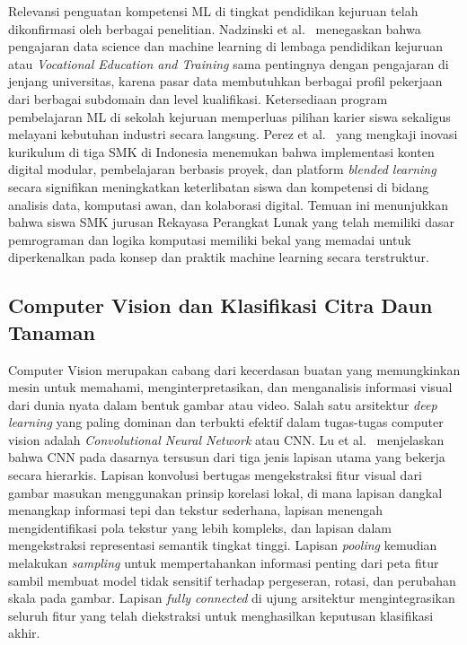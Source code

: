 Relevansi penguatan kompetensi ML di tingkat pendidikan kejuruan telah dikonfirmasi oleh berbagai penelitian. Nadzinski et al.\ \cite{Nadzinski2023} menegaskan bahwa pengajaran data science dan machine learning di lembaga pendidikan kejuruan atau \textit{Vocational Education and Training} sama pentingnya dengan pengajaran di jenjang universitas, karena pasar data membutuhkan berbagai profil pekerjaan dari berbagai subdomain dan level kualifikasi. Ketersediaan program pembelajaran ML di sekolah kejuruan memperluas pilihan karier siswa sekaligus melayani kebutuhan industri secara langsung. Perez et al.\ \cite{Kurikulum2025} yang mengkaji inovasi kurikulum di tiga SMK di Indonesia menemukan bahwa implementasi konten digital modular, pembelajaran berbasis proyek, dan platform \textit{blended learning} secara signifikan meningkatkan keterlibatan siswa dan kompetensi di bidang analisis data, komputasi awan, dan kolaborasi digital. Temuan ini menunjukkan bahwa siswa SMK jurusan Rekayasa Perangkat Lunak yang telah memiliki dasar pemrograman dan logika komputasi memiliki bekal yang memadai untuk diperkenalkan pada konsep dan praktik machine learning secara terstruktur.

\subsection{Computer Vision dan Klasifikasi Citra Daun Tanaman}
Computer Vision merupakan cabang dari kecerdasan buatan yang memungkinkan mesin untuk memahami, menginterpretasikan, dan menganalisis informasi visual dari dunia nyata dalam bentuk gambar atau video. Salah satu arsitektur \textit{deep learning} yang paling dominan dan terbukti efektif dalam tugas-tugas computer vision adalah \textit{Convolutional Neural Network} atau CNN. Lu et al.\ \cite{Lu2021} menjelaskan bahwa CNN pada dasarnya tersusun dari tiga jenis lapisan utama yang bekerja secara hierarkis. Lapisan konvolusi bertugas mengekstraksi fitur visual dari gambar masukan menggunakan prinsip korelasi lokal, di mana lapisan dangkal menangkap informasi tepi dan tekstur sederhana, lapisan menengah mengidentifikasi pola tekstur yang lebih kompleks, dan lapisan dalam mengekstraksi representasi semantik tingkat tinggi. Lapisan \textit{pooling} kemudian melakukan \textit{sampling} untuk mempertahankan informasi penting dari peta fitur sambil membuat model tidak sensitif terhadap pergeseran, rotasi, dan perubahan skala pada gambar. Lapisan \textit{fully connected} di ujung arsitektur mengintegrasikan seluruh fitur yang telah diekstraksi untuk menghasilkan keputusan klasifikasi akhir.

